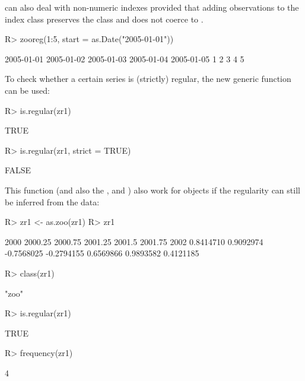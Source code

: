 \documentclass[article,nojss]{jss}
\begin{document}
 can also deal with non-numeric indexes provided that adding 
observations to the index class preserves the class and does not coerce to .

\begin{Schunk}
\begin{Sinput}
R> zooreg(1:5, start = as.Date("2005-01-01"))
\end{Sinput}
\begin{Soutput}
2005-01-01 2005-01-02 2005-01-03 2005-01-04 2005-01-05 
         1          2          3          4          5 
\end{Soutput}
\end{Schunk}


To check whether a certain series is (strictly) regular, the new generic function
 can be used:

\begin{Schunk}
\begin{Sinput}
R> is.regular(zr1)
\end{Sinput}
\begin{Soutput}
[1] TRUE
\end{Soutput}
\begin{Sinput}
R> is.regular(zr1, strict = TRUE)
\end{Sinput}
\begin{Soutput}
[1] FALSE
\end{Soutput}
\end{Schunk}

This function (and also the ,  and ) also 
work for  objects if the regularity can still be inferred from the data:

\begin{Schunk}
\begin{Sinput}
R> zr1 <- as.zoo(zr1)
R> zr1
\end{Sinput}
\begin{Soutput}
      2000    2000.25    2000.75    2001.25     2001.5    2001.75       2002 
 0.8414710  0.9092974 -0.7568025 -0.2794155  0.6569866  0.9893582  0.4121185 
\end{Soutput}
\begin{Sinput}
R> class(zr1)
\end{Sinput}
\begin{Soutput}
[1] "zoo"
\end{Soutput}
\begin{Sinput}
R> is.regular(zr1)
\end{Sinput}
\begin{Soutput}
[1] TRUE
\end{Soutput}
\begin{Sinput}
R> frequency(zr1)
\end{Sinput}
\begin{Soutput}
[1] 4
\end{Soutput}
\end{Schunk}
\end{document}
